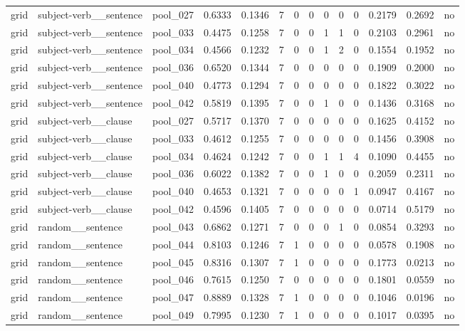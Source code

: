 \begin{table}[t]
{\begin{tabular}{llllllllllllll}
grid & subject-verb\_\_sentence & pool\_027 & 0.6333 & 0.1346 & 7 & 0 & 0 & 0 & 0 & 0 & 0.2179 & 0.2692 & no \\
grid & subject-verb\_\_sentence & pool\_033 & 0.4475 & 0.1258 & 7 & 0 & 0 & 1 & 1 & 0 & 0.2103 & 0.2961 & no \\
grid & subject-verb\_\_sentence & pool\_034 & 0.4566 & 0.1232 & 7 & 0 & 0 & 1 & 2 & 0 & 0.1554 & 0.1952 & no \\
grid & subject-verb\_\_sentence & pool\_036 & 0.6520 & 0.1344 & 7 & 0 & 0 & 0 & 0 & 0 & 0.1909 & 0.2000 & no \\
grid & subject-verb\_\_sentence & pool\_040 & 0.4773 & 0.1294 & 7 & 0 & 0 & 0 & 0 & 0 & 0.1822 & 0.3022 & no \\
grid & subject-verb\_\_sentence & pool\_042 & 0.5819 & 0.1395 & 7 & 0 & 0 & 1 & 0 & 0 & 0.1436 & 0.3168 & no \\
grid & subject-verb\_\_clause & pool\_027 & 0.5717 & 0.1370 & 7 & 0 & 0 & 0 & 0 & 0 & 0.1625 & 0.4152 & no \\
grid & subject-verb\_\_clause & pool\_033 & 0.4612 & 0.1255 & 7 & 0 & 0 & 0 & 0 & 0 & 0.1456 & 0.3908 & no \\
grid & subject-verb\_\_clause & pool\_034 & 0.4624 & 0.1242 & 7 & 0 & 0 & 1 & 1 & 4 & 0.1090 & 0.4455 & no \\
grid & subject-verb\_\_clause & pool\_036 & 0.6022 & 0.1382 & 7 & 0 & 0 & 1 & 0 & 0 & 0.2059 & 0.2311 & no \\
grid & subject-verb\_\_clause & pool\_040 & 0.4653 & 0.1321 & 7 & 0 & 0 & 0 & 0 & 1 & 0.0947 & 0.4167 & no \\
grid & subject-verb\_\_clause & pool\_042 & 0.4596 & 0.1405 & 7 & 0 & 0 & 0 & 0 & 0 & 0.0714 & 0.5179 & no \\
grid & random\_\_sentence & pool\_043 & 0.6862 & 0.1271 & 7 & 0 & 0 & 0 & 1 & 0 & 0.0854 & 0.3293 & no \\
grid & random\_\_sentence & pool\_044 & 0.8103 & 0.1246 & 7 & 1 & 0 & 0 & 0 & 0 & 0.0578 & 0.1908 & no \\
grid & random\_\_sentence & pool\_045 & 0.8316 & 0.1307 & 7 & 1 & 0 & 0 & 0 & 0 & 0.1773 & 0.0213 & no \\
grid & random\_\_sentence & pool\_046 & 0.7615 & 0.1250 & 7 & 0 & 0 & 0 & 0 & 0 & 0.1801 & 0.0559 & no \\
grid & random\_\_sentence & pool\_047 & 0.8889 & 0.1328 & 7 & 1 & 0 & 0 & 0 & 0 & 0.1046 & 0.0196 & no \\
grid & random\_\_sentence & pool\_049 & 0.7995 & 0.1230 & 7 & 1 & 0 & 0 & 0 & 0 & 0.1017 & 0.0395 & no \\

\end{tabular}}
\end{table}
